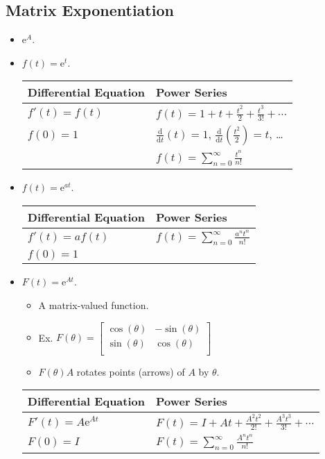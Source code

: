 \documentclass{article}
\newcommand{\e}{\text{e}}
\begin{document}
\subsection*{Matrix Exponentiation}
\begin{itemize}
    \item $\e^A$.
    \item $f(t) = \e^t$.
    \begin{center}
        \renewcommand{\arraystretch}{1.8}
        \begin{tabular}{l|l}
            Differential Equation & Power Series\\
            \hline
            $f'(t)=f(t)$ & $f(t)=1+t+\frac{t^2}{2}+\frac{t^3}{3!}+\cdots$\\
            $f(0)=1$ & $\frac{\text{d}}{\text{d}t}(t)=1$, $\frac{\text{d}}{\text{d}t}\left( \frac{t^2}{2} \right)=t$, \dots\\
            & $f(t)=\sum_{n=0}^\infty \frac{t^n}{n!}$
        \end{tabular}
    \end{center}
    \item $f(t)=\e^{at}$.
    \begin{center}
        \renewcommand{\arraystretch}{1.6}
        \begin{tabular}{l|l}
            Differential Equation & Power Series\\
            \hline
            $f'(t)=af(t)$ & $f(t)=\sum_{n=0}^\infty \frac{a^nt^n}{n!}$\\
            $f(0)=1$ &\\
        \end{tabular}
    \end{center}
    \item $F(t)=\e^{At}$.
    \begin{itemize}
        \item A matrix-valued function.
        \item Ex. $
            F(\theta) =
            \begin{bmatrix}
                \cos(\theta) & -\sin(\theta)\\
                \sin(\theta) & \cos(\theta)\\
            \end{bmatrix}
        $
        \item $F(\theta)A$ rotates points (arrows) of $A$ by $\theta$.
    \end{itemize}
    \begin{center}
        \renewcommand{\arraystretch}{1.6}
        \begin{tabular}{l|l}
            Differential Equation & Power Series\\
            \hline
            $F'(t)=A\e^{At}$ & $F(t)=I+At+\frac{A^2t^2}{2!}+\frac{A^3t^3}{3!}+\cdots$\\
            $F(0)=I$ & $F(t)=\sum_{n=0}^\infty \frac{A^nt^n}{n!}$\\
        \end{tabular}
    \end{center}
\end{itemize}
\end{document}
